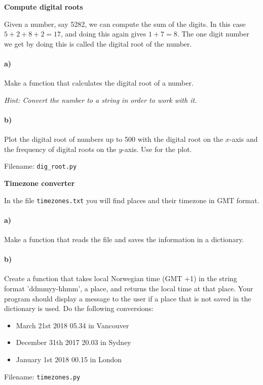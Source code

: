 \begin{Problem}{\textbf{Compute digital roots}}

\noindent Given a number, say 5282, we can compute the sum of the digits. In this case
$5+2+8+2=17$, and doing this again gives $1+7=8$. The one digit number we get by
doing this is called the digital root of the number.

\paragraph{a)}
Make a function that calculates the digital root of a number.

\emph{Hint: Convert the number to a string in order to work with it.}

\paragraph{b)}
Plot the digital root of numbers up to 500 with the digital root on the $x$-axis and
the frequency of digital roots on the $y$-axis. Use  for the plot.

Filename: \texttt{dig\_root.py}
\end{Problem}



\begin{Problem}{\textbf{Timezone converter}}

\noindent In the file \texttt{timezones.txt} you will find places and their timezone in
GMT format.

\paragraph{a)}
Make a function that reads the file and saves the information in a dictionary.

\paragraph{b)}
Create a function that takes local Norwegian time (GMT +1) in the string format
'ddmmyy-hhmm', a place, and returns the local time at that place. Your program
should display a message to the user if a place that is not saved in the
dictionary is used. Do the following conversions:
\begin{itemize}
    \item March 21st 2018 05.34 in Vancouver
    \item December 31th 2017 20.03 in Sydney
    \item January 1st 2018 00.15 in London
\end{itemize}

Filename: \texttt{timezones.py}
\end{Problem}

